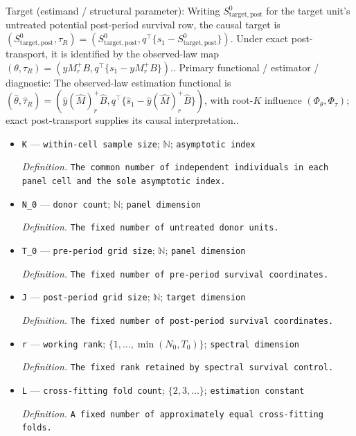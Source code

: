 \documentclass{article}
\begin{document}
Target (estimand / structural parameter): Writing \(S^0_{\mathrm{target,post}}\) for the target unit's untreated potential post-period survival row, the causal target is \((S^0_{\mathrm{target,post}},\tau_R)=(S^0_{\mathrm{target,post}},q^\top\{s_1-S^0_{\mathrm{target,post}}\})\). Under exact post-transport, it is identified by the observed-law map \((\theta,\tau_R)=(yM_r^+B,q^\top\{s_1-yM_r^+B\})\)..
Primary functional / estimator / diagnostic: The observed-law estimation functional is \((\widehat\theta,\widehat\tau_R)=(\widehat y(\widehat M)_r^+\widehat B,q^\top\{\widehat s_1-\widehat y(\widehat M)_r^+\widehat B\})\), with root-\(K\) influence \((\Phi_{\theta},\Phi_\tau)\); exact post-transport supplies its causal interpretation..
\begin{itemize}
  \item \texttt{K} --- \texttt{within-\allowbreak{}cell sample size}; \(\mathbb N\); \texttt{asymptotic index}
  \par\smallskip\noindent\emph{Definition.} \texttt{The common number of independent individuals in each panel cell and the sole asymptotic index.}
  \item \texttt{N\_\allowbreak{}0} --- \texttt{donor count}; \(\mathbb N\); \texttt{panel dimension}
  \par\smallskip\noindent\emph{Definition.} \texttt{The fixed number of untreated donor units.}
  \item \texttt{T\_\allowbreak{}0} --- \texttt{pre-\allowbreak{}period grid size}; \(\mathbb N\); \texttt{panel dimension}
  \par\smallskip\noindent\emph{Definition.} \texttt{The fixed number of pre-\allowbreak{}period survival coordinates.}
  \item \texttt{J} --- \texttt{post-\allowbreak{}period grid size}; \(\mathbb N\); \texttt{target dimension}
  \par\smallskip\noindent\emph{Definition.} \texttt{The fixed number of post-\allowbreak{}period survival coordinates.}
  \item \texttt{r} --- \texttt{working rank}; \(\{1,\ldots,\min(N_0,T_0)\}\); \texttt{spectral dimension}
  \par\smallskip\noindent\emph{Definition.} \texttt{The fixed rank retained by spectral survival control.}
  \item \texttt{L} --- \texttt{cross-\allowbreak{}fitting fold count}; \(\{2,3,\ldots\}\); \texttt{estimation constant}
  \par\smallskip\noindent\emph{Definition.} \texttt{A fixed number of approximately equal cross-\allowbreak{}fitting folds.}

\end{itemize}
\end{document}
